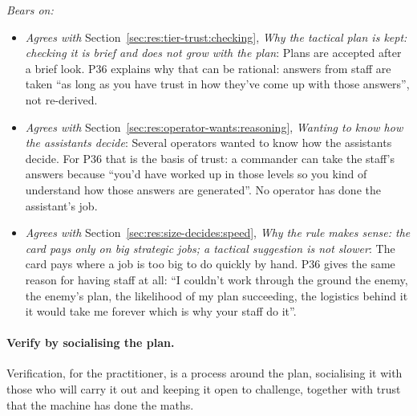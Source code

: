 \noindent\textit{Bears on:}
\begin{itemize}[leftmargin=1.2em,itemsep=1pt]\small
\item \textit{Agrees with} Section~\ref{sec:res:tier-trust:checking}, \emph{Why the tactical plan is kept: checking it is brief and does not grow with the plan}: Plans are accepted after a brief look. P36 explains why that can be rational: answers from staff are taken ``as long as you have trust in how they've come up with those answers'', not re-derived.
\item \textit{Agrees with} Section~\ref{sec:res:operator-wants:reasoning}, \emph{Wanting to know how the assistants decide}: Several operators wanted to know how the assistants decide. For P36 that is the basis of trust: a commander can take the staff's answers because ``you'd have worked up in those levels so you kind of understand how those answers are generated''. No operator has done the assistant's job.
\item \textit{Agrees with} Section~\ref{sec:res:size-decides:speed}, \emph{Why the rule makes sense: the card pays only on big strategic jobs; a tactical suggestion is not slower}: The card pays where a job is too big to do quickly by hand. P36 gives the same reason for having staff at all: ``I couldn't work through the ground the enemy, the enemy's plan, the likelihood of my plan succeeding, the logistics behind it it would take me forever which is why your staff do it''.
\end{itemize}


\label{sec:qual:practitioner:pt-trust-but-verify}\paragraph{Verify by socialising the plan.}
Verification, for the practitioner, is a process around the plan, socialising it with those who will carry it out and keeping it open to challenge, together with trust that the machine has done the maths.

